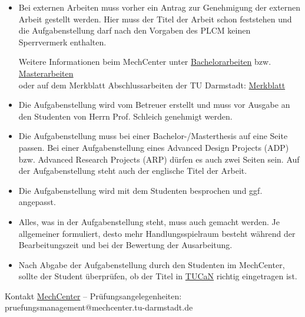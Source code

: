 \begin{sloppypar}
\begin{itemize}
    \item Bei externen Arbeiten muss vorher ein Antrag zur Genehmigung der externen Arbeit gestellt werden. Hier muss der Titel der Arbeit schon feststehen und die Aufgabenstellung darf nach den Vorgaben des PLCM keinen Sperrvermerk enthalten.

    Weitere Informationen beim MechCenter unter \href{https://www.maschinenbau.tu-darmstadt.de/studieren/studierende/studium_bachelor/abschlussarbeiten_bachelor/index.de.jsp}{Bachelorarbeiten}  bzw. \href{https://www.maschinenbau.tu-darmstadt.de/studieren/studierende/studium_master/abschlussarbeit/index.de.jsp}{Masterarbeiten} \\
    oder auf dem Merkblatt Abschlussarbeiten der TU Darmstadt:
    \href{https://www.tu-darmstadt.de/media/dezernat_ii/referat_iig/fuer_pruefende/merkblaetter/info_externe_abschlussarbeiten.pdf}{Merkblatt}

    \item Die Aufgabenstellung wird vom Betreuer erstellt und muss vor Ausgabe an den Studenten von Herrn Prof. Schleich genehmigt werden. 

    \item Die Aufgabenstellung muss bei einer Bachelor-/Masterthesis auf eine Seite passen. Bei einer Aufgabenstellung eines Advanced Design Projects (ADP) bzw. Advanced Research Projects (ARP) dürfen es auch zwei Seiten sein. Auf der Aufgabenstellung steht auch der englische Titel der Arbeit. 

    \item Die Aufgabenstellung wird mit dem Studenten besprochen und ggf. angepasst. 

    \item Alles, was in der Aufgabenstellung steht, muss auch gemacht werden. Je allgemeiner formuliert, desto mehr Handlungsspielraum besteht während der Bearbeitungszeit und bei der Bewertung der Ausarbeitung.


    \item Nach Abgabe der Aufgabenstellung durch den Studenten im MechCenter, sollte der Student überprüfen, ob der Titel in \href{https://www.tucan.tu-darmstadt.de}{TUCaN} richtig eingetragen ist. 

\end{itemize}

Kontakt \href{https://www.maschinenbau.tu-darmstadt.de/studieren/mechcenter_studienbuero/pruefungsangelegenheiten/index.de.jsp}{MechCenter} -- Prüfungsangelegenheiten:\\ pruefungsmanagement@mechcenter.tu-darmstadt.de 

\end{sloppypar}


